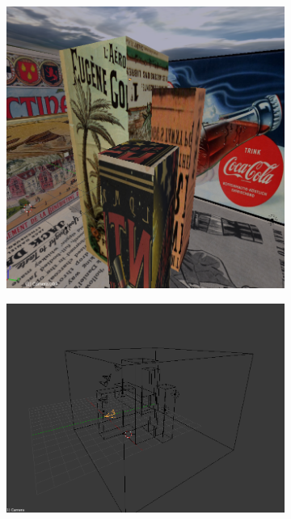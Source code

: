 \begin{figure}
\begin{subfigure}{0.4\textwidth}
		\includegraphics[width=\textwidth]{img/test6_2}
	\end{subfigure}
	\begin{subfigure}{0.4\textwidth}
		\centering
		\includegraphics[width=\textwidth]{img/test6_3}
	\end{subfigure}
	\begin{subfigure}{0.4\textwidth}
		\centering

\end{subfigure}
\end{figure}
